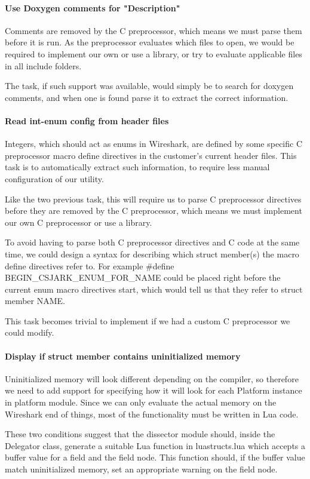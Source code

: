 \paragraph{Use Doxygen comments for "Description"}
Comments are removed by the C preprocessor, which means we must parse them before it is run. As the preprocessor evaluates which files to open, we would be required to implement our own or use a library, or try to evaluate applicable files in all include folders.

The task, if such support was available, would simply be to search for doxygen comments, and when one is found parse it to extract the correct information.

\paragraph{Read int-enum config from header files}
Integers, which should act as enums in Wireshark, are defined by some specific C preprocessor macro define directives in the customer's current header files. This task is to automatically extract such information, to require less manual configuration of our utility.

Like the two previous task, this will require us to parse C preprocessor directives before they are removed by the C preprocessor, which means we must implement our own C preprocessor or use a library.

To avoid having to parse both C preprocessor directives and C code at the same time, we could design a syntax for describing which struct member(s) the macro define directives refer to. For example \#define BEGIN\_CSJARK\_ENUM\_FOR\_NAME could be placed right before the current enum macro directives start, which would tell us that they refer to struct member NAME.

This task becomes trivial to implement if we had a custom C preprocessor we could modify.

\paragraph{Display if struct member contains uninitialized memory}
Uninitialized memory will look different depending on the compiler, so therefore we need to add support for specifying how it will look for each Platform instance in platform module. Since we can only evaluate the actual memory on the Wireshark end of things, most of the functionality must be written in Lua code.

These two conditions suggest that the dissector module should, inside the Delegator class, generate a suitable Lua function in luastructs.lua which accepts a buffer value for a field and the field node. This function should, if the buffer value match uninitialized memory,  set an appropriate warning on the field node.

